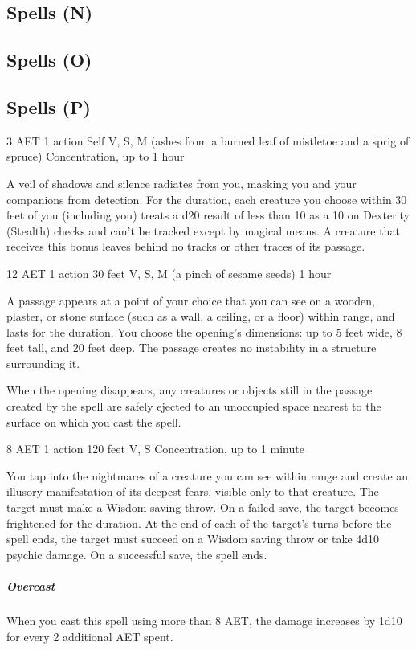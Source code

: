 \subsection{Spells (N)}

\subsection{Spells (O)}

\subsection{Spells (P)}

\label{spell:pass-without-trace}
{3 AET}
{1 action}
{Self}
{V, S, M (ashes from a burned leaf of mistletoe and a sprig of spruce)}
{Concentration, up to 1 hour}

A veil of shadows and silence radiates from you, masking you and your companions from detection. For the duration, each creature you choose within 30 feet of you (including you) treats a d20 result of less than 10 as a 10 on Dexterity (Stealth) checks and can't be tracked except by magical means. A creature that receives this bonus leaves behind no tracks or other traces of its passage.

\label{spell:passwall}
{12 AET}
{1 action}
{30 feet}
{V, S, M (a pinch of sesame seeds)}
{1 hour}

A passage appears at a point of your choice that you can see on a wooden, plaster, or stone surface (such as a wall, a ceiling, or a floor) within range, and lasts for the duration. You choose the opening's dimensions: up to 5 feet wide, 8 feet tall, and 20 feet deep. The passage creates no instability in a structure surrounding it.

When the opening disappears, any creatures or objects still in the passage created by the spell are safely ejected to an unoccupied space nearest to the surface on which you cast the spell.

\label{spell:phantasmal-killer}
{8 AET}
{1 action}
{120 feet}
{V, S}
{Concentration, up to 1 minute}

You tap into the nightmares of a creature you can see within range and create an illusory manifestation of its deepest fears, visible only to that creature. The target must make a Wisdom saving throw. On a failed save, the target becomes frightened for the duration. At the end of each of the target's turns before the spell ends, the target must succeed on a Wisdom saving throw or take 4d10 psychic damage. On a successful save, the spell ends.
\subparagraph*{Overcast} When you cast this spell using more than 8 AET, the damage increases by 1d10 for every 2 additional AET spent.


